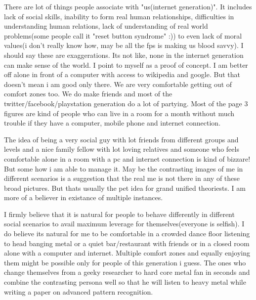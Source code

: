 There are lot of things people associate with "us(internet generation)". It includes  lack of social skills, inability to form real human relationships, difficulties in understanding human relations, lack of understanding of real world problems(some people call it "reset button syndrome" :)) to even lack of moral values(i don't really know how, may be all the fps is making us blood savvy). I should say these are exaggerations. Its not like, none in the internet generation can make sense of the world. I point to myself as a proof of concept. I am better off alone in front of a computer with access to wikipedia and google. But that doesn't mean i am good only there. We are very comfortable getting out of comfort zones too. We do make friends and most of the twitter/facebook/playstation generation do a lot of partying. Most of the page 3 figures are kind of people who can live in a room for a month without much trouble if they have a computer, mobile phone and internet connection. 

The idea of being a very social guy with lot friends from different groups and levels and a nice family fellow with lot loving relatives and someone who feels comfortable alone in a room with a pc and internet connection is kind of bizzare! But some how i am able to manage it. May be the contrasting images of me in different scenarios is a suggestion that the real me is not there in any of these broad pictures. But thats usually the pet idea for grand unified theoriests. I am more of a believer in existance of multiple instances. 

I firmly believe that it is natural for people to behave differently in different social scenarios to avail maximum leverage for themselves(everyone is selfish). I do believe its natural for me to be comfortable in a crowded dance floor listening to head banging metal or a quiet bar/restaurant with friends or in a closed room alone with a computer and internet. Multiple comfort zones and equally enjoying them might be possible only for people of this generation i guess. The ones who change themselves from a geeky researcher to hard core metal fan in seconds and combine the contrasting persona well so that he will listen to heavy metal while writing a paper on advanced pattern recognition. 

